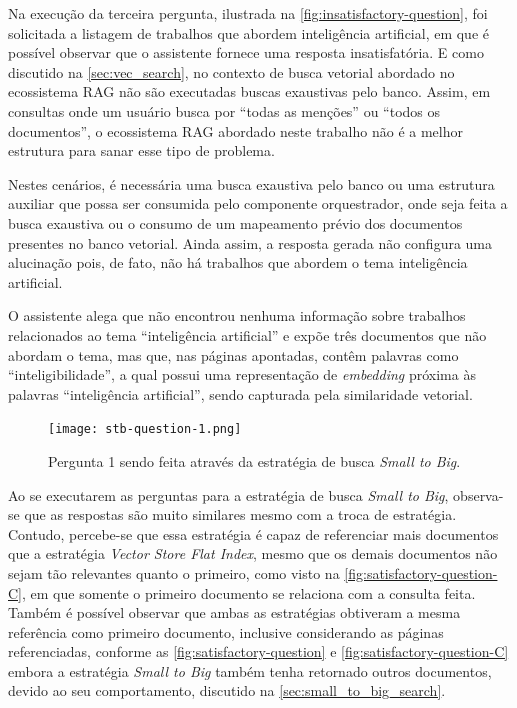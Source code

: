 \documentclass[a4paper, 12pt]{article}
\begin{document}
    Na execução da terceira pergunta, ilustrada na \autoref{fig:insatisfactory-question}, foi solicitada a listagem de trabalhos que abordem inteligência artificial, em que é possível observar que o assistente fornece uma resposta insatisfatória. E como discutido na \autoref{sec:vec_search}, no contexto de busca vetorial abordado no ecossistema RAG não são executadas buscas exaustivas pelo banco. Assim, em consultas onde um usuário busca por ``todas as menções'' ou ``todos os documentos'', o ecossistema RAG abordado neste trabalho não é a melhor estrutura para sanar esse tipo de problema. 
    
    Nestes cenários, é necessária uma busca exaustiva pelo banco ou uma estrutura auxiliar que possa ser consumida pelo componente orquestrador, onde seja feita a busca exaustiva ou o consumo de um mapeamento prévio dos documentos presentes no banco vetorial. Ainda assim, a resposta gerada não configura uma alucinação pois, de fato, não há trabalhos que abordem o tema inteligência artificial. 
    
    O assistente alega que não encontrou nenhuma informação sobre trabalhos relacionados ao tema ``inteligência artificial'' e expõe três documentos que não abordam o tema, mas que, nas páginas apontadas, contêm palavras como ``inteligibilidade'', a qual possui uma representação de \textit{embedding} próxima às palavras ``inteligência artificial'', sendo capturada pela similaridade vetorial.

    \clearpage
    
    \begin{figure}[ht]
        \texttt{[image: stb-question-1.png]}
        \centering
        \caption{Pergunta 1 sendo feita através da estratégia de busca \textit{Small to Big}.}
        \centering
        \label{fig:satisfactory-question-C}
    \end{figure}
    
    Ao se executarem as perguntas para a estratégia de busca \textit{Small to Big}, observa-se que as respostas são muito similares mesmo com a troca de estratégia. Contudo, percebe-se que essa estratégia é capaz de referenciar mais documentos que a estratégia \textit{Vector Store Flat Index}, mesmo que os demais documentos não sejam tão relevantes quanto o primeiro, como visto na \autoref{fig:satisfactory-question-C}, em que somente o primeiro documento se relaciona com a consulta feita. Também é possível observar que ambas as estratégias obtiveram a mesma referência como primeiro documento, inclusive considerando as páginas referenciadas, conforme as \autoref{fig:satisfactory-question} e \autoref{fig:satisfactory-question-C} embora a estratégia \textit{Small to Big} também tenha retornado outros documentos, devido ao seu comportamento, discutido na \autoref{sec:small_to_big_search}.
\end{document}
